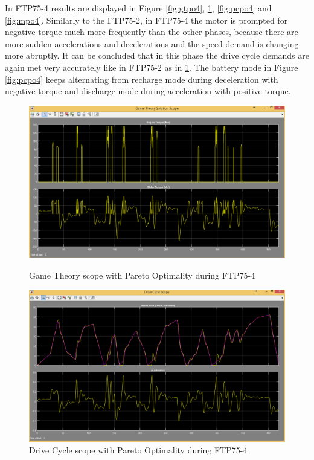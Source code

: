 In FTP75-4 results are displayed in Figure \ref{fig:gtpo4}, \ref{fig:dcpo4}, \ref{fig:pcpo4} and \ref{fig:mpo4}. Similarly to the FTP75-2, in FTP75-4 the motor is prompted for negative torque much more frequently than the other phases, because there are more sudden accelerations and decelerations and the speed demand is changing more abruptly. It can be concluded that in this phase the drive cycle demands are again met very accurately like in FTP75-2 as in \ref{fig:dcpo4}. The battery mode in Figure \ref{fig:pcpo4} keeps alternating from recharge mode during deceleration with negative torque and discharge mode during acceleration with positive torque.

\begin{figure}[hp]
\centering
\includegraphics[scale=0.45]{figures/Pareto/FTP75-4/gameTheory05Juli}
\caption{Game Theory scope with Pareto Optimality during FTP75-4}
\label{fig:gtpo4}
\includegraphics[scale=0.41]{figures/Pareto/FTP75-4/driveCycle05Juli}
\caption{Drive Cycle scope with Pareto Optimality during FTP75-4}
\label{fig:dcpo4}
\end{figure}

